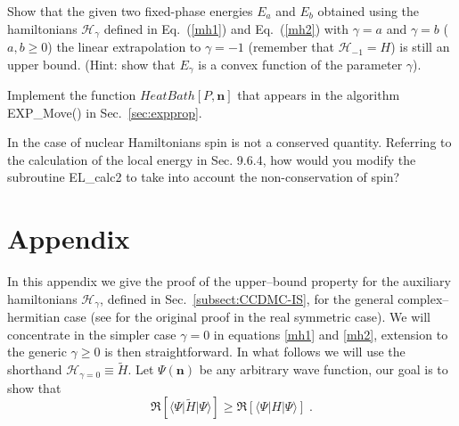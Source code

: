   \begin{prob}
  \label{prob:egamma}
	Show that the given two fixed-phase energies $E_{a}$ and $E_{b}$ obtained using the hamiltonians $\mathcal{H}_{\gamma}$ defined in Eq.~(\eqref{mh1}) and Eq.~(\eqref{mh2}) 
	with $\gamma=a$ and $\gamma=b$ ($a,b\geq 0$) the linear extrapolation to $\gamma=-1$ (remember that $\mathcal{H}_{-1}=H$) is still an upper bound. 
	(Hint: show that $E_\gamma$ is a convex function of the parameter $\gamma$).
  \end{prob}
  \begin{prob}
  \label{prob:heatbath}
        Implement the function $HeatBath[P,\mathbf{n}]$ that appears in the algorithm EXP\_Move() in Sec.~\ref{sec:expprop}.
  \end{prob}
\begin{prob}
In the case of nuclear Hamiltonians spin is not a conserved quantity. Referring to the calculation of the local energy in Sec. 9.6.4, how would you modify the subroutine EL\_calc2 to take into account the non-conservation of spin?
\end{prob}
  

\section*{Appendix}
In this appendix we give the proof of the upper--bound property for the auxiliary hamiltonians $\mathcal{H}_{\gamma}$, defined in Sec.~\ref{subsect:CCDMC-IS}, for
the general complex--hermitian case (see \cite{TenHaaf95} for the original proof in the real symmetric case).
We will concentrate in the simpler case $\gamma=0$ in equations \eqref{mh1} and \eqref{mh2}, extension to the generic $\gamma \geq 0$ is then straightforward. In what follows
 we will use the shorthand $\mathcal{H}_{\gamma=0} \equiv \widetilde{H}$. Let $\Psi(\mathbf{n})$ be any arbitrary wave function, our goal is to show that 
\begin{equation}
\Re [\langle \Psi \lvert \widetilde{H}\rvert\Psi \rangle]\geq\Re\left[ \langle \Psi |H|\Psi \rangle\right]\;. 
\end{equation}

